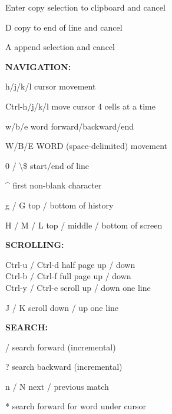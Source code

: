 \documentclass[11pt,a4paper,twoside]{book}
\begin{document}
Enter                 copy selection to clipboard and cancel

D                     copy to end of line and cancel

A                     append selection and cancel


\vspace{12pt}
{\bfseries\color{neonyellow} NAVIGATION:}\vspace{4pt}

h/j/k/l              cursor movement

\begin{codebox}
Ctrl-h/j/k/l         move cursor 4 cells at a time\\
\end{codebox}

w/b/e                word forward/backward/end

W/B/E                WORD (space-delimited) movement

0 / \textbackslash{}\$                start/end of line

\textasciicircum{}                     first non-blank character

g / G                top / bottom of history

H / M / L            top / middle / bottom of screen


\vspace{12pt}
{\bfseries\color{neonyellow} SCROLLING:}\vspace{4pt}

\begin{codebox}
Ctrl-u / Ctrl-d      half page up / down\\
Ctrl-b / Ctrl-f      full page up / down\\
Ctrl-y / Ctrl-e      scroll up / down one line\\
\end{codebox}

J / K                scroll down / up one line


\vspace{12pt}
{\bfseries\color{neonyellow} SEARCH:}\vspace{4pt}

/                     search forward (incremental)

?                     search backward (incremental)

n / N                next / previous match

*                     search forward for word under cursor
\end{document}
